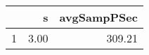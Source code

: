 \begin{table}[h]
\centering
\begin{tabular}{rrr}
  \hline
 & s & avgSampPSec \\ 
  \hline
1 & 3.00 & 309.21 \\ 
   \hline
\end{tabular}
\end{table}

